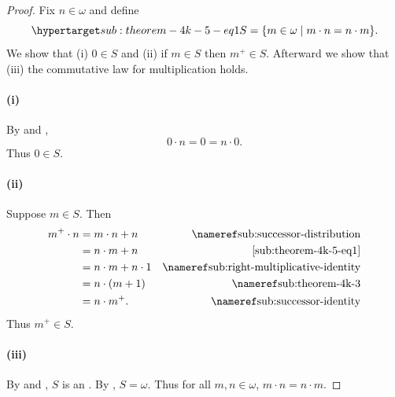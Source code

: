 \documentclass{report}
\begin{document}
  \begin{proof}

    Fix $n \in \omega$ and define
      \begin{equation}
        \hyperlabel{sub:theorem-4k-5-eq1}
        S = \{m \in \omega \mid m \cdot n = n \cdot m\}.
      \end{equation}
    We show that (i) $0 \in S$ and (ii) if $m \in S$ then $m^+ \in S$.
    Afterward we show that (iii) the commutative law for multiplication holds.

    \paragraph{(i)}%

      By  and ,
        $$0 \cdot n = 0 = n \cdot 0.$$
      Thus $0 \in S$.

    \paragraph{(ii)}%

      Suppose $m \in S$.
      Then
        \begin{align*}
          m^+ \cdot n
            & = m \cdot n + n & \textref{sub:successor-distribution} \\
            & = n \cdot m + n & \eqref{sub:theorem-4k-5-eq1} \\
            & = n \cdot m + n \cdot 1
              & \textref{sub:right-multiplicative-identity} \\
            & = n \cdot (m + 1) & \textref{sub:theorem-4k-3} \\
            & = n \cdot m^+. & \textref{sub:successor-identity}
        \end{align*}
      Thus $m^+ \in S$.

    \paragraph{(iii)}%

      By  and , $S$
        is an .
      By , $S = \omega$.
      Thus for all $m, n \in \omega$, $m \cdot n = n \cdot m$.

  \end{proof}
\end{document}
